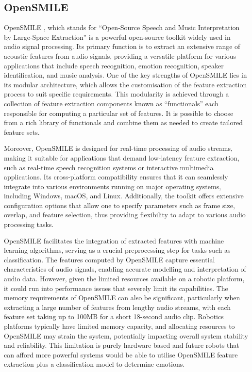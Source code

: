 \subsection{OpenSMILE}

OpenSMILE \cite{opensmile-2010}, which stands for ``Open-Source Speech and Music Interpretation by Large-Space Extraction'' is a powerful open-source toolkit widely used in audio signal processing. Its primary function is to extract an extensive range of acoustic features from audio signals, providing a versatile platform for various applications that include speech recognition, emotion recognition, speaker identification, and music analysis. One of the key strengths of OpenSMILE lies in its modular architecture, which allows the customisation of the feature extraction process to suit specific requirements. This modularity is achieved through a collection of feature extraction components known as ``functionals'' each responsible for computing a particular set of features. It is possible to choose from a rich library of functionals and combine them as needed to create tailored feature sets.

Moreover, OpenSMILE is designed for real-time processing of audio streams, making it suitable for applications that demand low-latency feature extraction, such as real-time speech recognition systems or interactive multimedia applications. Its cross-platform compatibility ensures that it can seamlessly integrate into various environments running on major operating systems, including Windows, macOS, and Linux. Additionally, the toolkit offers extensive configuration options that allow one to specify parameters such as frame size, overlap, and feature selection, thus providing flexibility to adapt to various audio processing tasks.

OpenSMILE facilitates the integration of extracted features with machine learning algorithms, serving as a crucial preprocessing step for tasks such as classification. The features computed by OpenSMILE capture essential characteristics of audio signals, enabling accurate modelling and interpretation of audio data. However, given the limited resources available on a robotic platform, it could run into performance issues that severely limit its capabilities. The memory requirements of OpenSMILE can also be significant, particularly when extracting a large number of features from lengthy audio streams, with each feature set taking up to 100MB for a short 18-second audio clip. Robotics platforms typically have limited memory capacity, and allocating resources to OpenSMILE may strain the system, potentially impacting overall system stability and reliability. This limitation is purely hardware based and future robots that can afford more powerful systems would be able to utilise OpenSMILE feature extraction plus a classification model to determine emotions.

